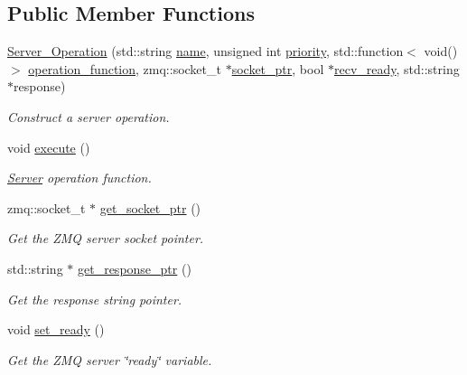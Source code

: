 \subsection*{Public Member Functions}
\begin{DoxyCompactItemize}
\item 
\hyperlink{classzcm_1_1Server__Operation_a79909424f8e316212190e0802183945b}{Server\-\_\-\-Operation} (std\-::string \hyperlink{classzcm_1_1Base__Operation_a2e2192550818d8f063fc7b2c76c5e21c}{name}, unsigned int \hyperlink{classzcm_1_1Base__Operation_a38af3bcc2578ef215772d595bf3fa358}{priority}, std\-::function$<$ void()$>$ \hyperlink{classzcm_1_1Server__Operation_af6df162db0b1f42248b52c8925dcc64d}{operation\-\_\-function}, zmq\-::socket\-\_\-t $\ast$\hyperlink{classzcm_1_1Server__Operation_a07efad79c512d03a54fe2bb99166d52f}{socket\-\_\-ptr}, bool $\ast$\hyperlink{classzcm_1_1Server__Operation_a2b71778be842aedf6d122b531e186ca8}{recv\-\_\-ready}, std\-::string $\ast$response)
\begin{DoxyCompactList}\small\item\em Construct a server operation. \end{DoxyCompactList}\item 
void \hyperlink{classzcm_1_1Server__Operation_acd6b89c42aad3df5dc78674770326498}{execute} ()
\begin{DoxyCompactList}\small\item\em \hyperlink{classzcm_1_1Server}{Server} operation function. \end{DoxyCompactList}\item 
zmq\-::socket\-\_\-t $\ast$ \hyperlink{classzcm_1_1Server__Operation_a17d90d76a8cfa0dc25792144e155e7c0}{get\-\_\-socket\-\_\-ptr} ()
\begin{DoxyCompactList}\small\item\em Get the Z\-M\-Q server socket pointer. \end{DoxyCompactList}\item 
std\-::string $\ast$ \hyperlink{classzcm_1_1Server__Operation_a53e4318fbb1fcc7ec2f2382d401f9c81}{get\-\_\-response\-\_\-ptr} ()
\begin{DoxyCompactList}\small\item\em Get the response string pointer. \end{DoxyCompactList}\item 
void \hyperlink{classzcm_1_1Server__Operation_a1477e76e1639bdebc6b855d3be4e9fb2}{set\-\_\-ready} ()
\begin{DoxyCompactList}\small\item\em Get the Z\-M\-Q server \char`\"{}ready\char`\"{} variable. \end{DoxyCompactList}\item 

\end{DoxyCompactItemize}
